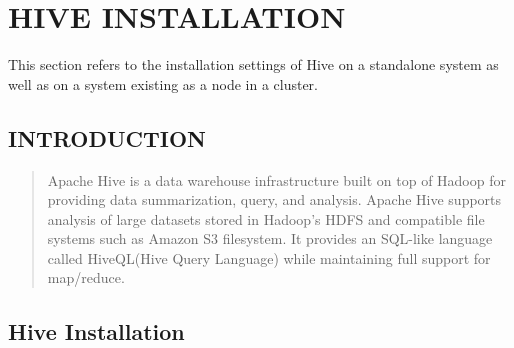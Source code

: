 \documentclass[letterpaper,10pt,english]{sphinxmanual}
\begin{document}
\begin{figure}[htbp]
\centering

\end{figure}


\chapter{HIVE INSTALLATION}
\label{hive:hive-installation}\label{hive::doc}
This section refers to the installation settings of Hive on a standalone system
as well as on a system existing as a node in a cluster.


\section{INTRODUCTION}
\label{hive:introduction}\begin{quote}

Apache Hive is a data warehouse infrastructure built on top of Hadoop for providing data summarization, query, and analysis. Apache Hive supports analysis of large datasets stored in Hadoop's HDFS and compatible file systems such as Amazon S3 filesystem. It provides an SQL-like language called HiveQL(Hive Query Language) while maintaining full support for map/reduce.
\end{quote}


\section{Hive Installation}
\label{hive:id1}
\end{document}
